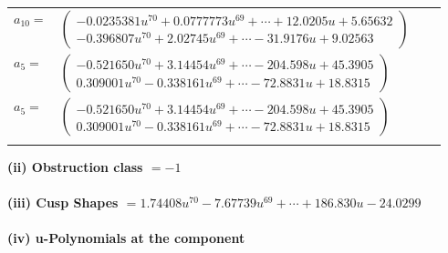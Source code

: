 \documentclass[1p]{elsarticle_modified}
\theoremstyle{definition}
\begin{document}
\begin{tabular}{m{7pt} m{180pt} m{7pt} m{180pt} }
\flushright $a_{10}=$&$\begin{pmatrix}-0.0235381 u^{70}+0.0777773 u^{69}+\cdots+12.0205 u+5.65632\\-0.396807 u^{70}+2.02745 u^{69}+\cdots-31.9176 u+9.02563\end{pmatrix}$ \\
\flushright $a_{5}=$&$\begin{pmatrix}-0.521650 u^{70}+3.14454 u^{69}+\cdots-204.598 u+45.3905\\0.309001 u^{70}-0.338161 u^{69}+\cdots-72.8831 u+18.8315\end{pmatrix}$\\ \flushright $a_{5}=$&$\begin{pmatrix}-0.521650 u^{70}+3.14454 u^{69}+\cdots-204.598 u+45.3905\\0.309001 u^{70}-0.338161 u^{69}+\cdots-72.8831 u+18.8315\end{pmatrix}$\\&\end{tabular}
\flushleft \textbf{(ii) Obstruction class $= -1$}\\~\\
\flushleft \textbf{(iii) Cusp Shapes $= 1.74408 u^{70}-7.67739 u^{69}+\cdots+186.830 u-24.0299$}\\~\\
\newpage\renewcommand{\arraystretch}{1}
\flushleft \textbf{(iv) u-Polynomials at the component}\newline \\
\end{document}
